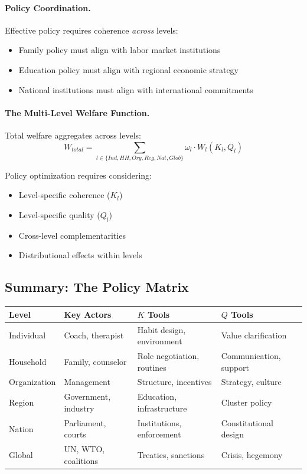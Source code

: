 \documentclass[12pt,a4paper]{article}
\begin{document}
\paragraph{Policy Coordination.}
Effective policy requires coherence \emph{across} levels:
\begin{itemize}
  \item Family policy must align with labor market institutions
  \item Education policy must align with regional economic strategy
  \item National institutions must align with international commitments
\end{itemize}

\paragraph{The Multi-Level Welfare Function.}
Total welfare aggregates across levels:
\begin{equation}
  W_{total} = \sum_{l \in \{Ind, HH, Org, Reg, Nat, Glob\}} \omega_l \cdot W_l(K_l, Q_l)
\end{equation}

Policy optimization requires considering:
\begin{itemize}
  \item Level-specific coherence ($K_l$)
  \item Level-specific quality ($Q_l$)
  \item Cross-level complementarities
  \item Distributional effects within levels
\end{itemize}

\subsection{Summary: The Policy Matrix}

\begin{center}
\renewcommand{\arraystretch}{1.3}
\small
\begin{tabular}{llll}
\hline
\textbf{Level} & \textbf{Key Actors} & \textbf{$K$ Tools} & \textbf{$Q$ Tools} \\
\hline
Individual & Coach, therapist & Habit design, environment & Value clarification \\
Household & Family, counselor & Role negotiation, routines & Communication, support \\
Organization & Management & Structure, incentives & Strategy, culture \\
Region & Government, industry & Education, infrastructure & Cluster policy \\
Nation & Parliament, courts & Institutions, enforcement & Constitutional design \\
Global & UN, WTO, coalitions & Treaties, sanctions & Crisis, hegemony \\
\hline
\end{tabular}
\end{center}
\end{document}
